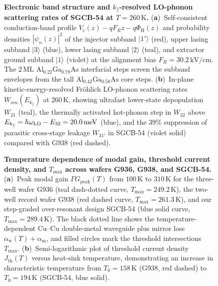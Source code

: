 \documentclass[11pt,letterpaper]{article}
\renewcommand{\hbar}{\mathchar'26\mkern-9mu h}
\begin{document}
\begin{figure}[t!]
\centering
\resizebox{0.97\textwidth}{!}{}
\caption{\textbf{Electronic band structure and $k_\parallel$-resolved LO-phonon scattering rates of SGCB-54 at $T = 260\,\mathrm{K}$.} (\textbf{a})~Self-consistent conduction-band profile $V_c(z) - q F_R z - q\Phi_{\mathrm{H}}(z)$ and probability densities $|\psi_n(z)|^2$ of the injector subband $|1'\rangle$ (red), upper lasing subband $|3\rangle$ (blue), lower lasing subband $|2\rangle$ (teal), and extractor ground subband $|1\rangle$ (violet) at the alignment bias $F_R = 30.2\,\mathrm{kV/cm}$. The $2\,\mathrm{ML}$ $\mathrm{Al}_{0.22}\mathrm{Ga}_{0.78}\mathrm{As}$ interfacial steps screen the subband envelopes from the tall $\mathrm{Al}_{0.42}\mathrm{Ga}_{0.58}\mathrm{As}$ core steps. (\textbf{b})~In-plane kinetic-energy-resolved Fr\"ohlich LO-phonon scattering rates $W_{mn}(E_{k_\parallel})$ at $260\,\mathrm{K}$, showing ultrafast lower-state depopulation $W_{21}$ (teal), the thermally activated hot-phonon step in $W_{32}$ above $E_{k_\parallel} = \hbar\omega_{\mathrm{LO}} - E_{32} = 20.0\,\mathrm{meV}$ (blue), and the $39\%$ suppression of parasitic cross-stage leakage $W_{31'}$ in SGCB-54 (violet solid) compared with G938 (red dashed).}
\label{fig:real_subbands}
\end{figure}

\begin{figure}[t!]
\centering
\resizebox{0.97\textwidth}{!}{}
\caption{\textbf{Temperature dependence of modal gain, threshold current density, and $T_{\max}$ across wafers G936, G938, and SGCB-54.} (\textbf{a})~Peak modal gain $\Gamma G_{\mathrm{peak}}(T)$ from $100\,\mathrm{K}$ to $310\,\mathrm{K}$ for the three-well wafer G936 (teal dash-dotted curve, $T_{\max} = 249.2\,\mathrm{K}$), the two-well record wafer G938 (red dashed curve, $T_{\max} = 261.3\,\mathrm{K}$), and our step-graded over-resonant design SGCB-54 (blue solid curve, $T_{\max} = 289.4\,\mathrm{K}$). The black dotted line shows the temperature-dependent $\mathrm{Cu}$--$\mathrm{Cu}$ double-metal waveguide plus mirror loss $\alpha_{\mathrm{w}}(T) + \alpha_{\mathrm{m}}$, and filled circles mark the threshold intersections $T_{\max}$. (\textbf{b})~Semi-logarithmic plot of threshold current density $J_{\mathrm{th}}(T)$ versus heat-sink temperature, demonstrating an increase in characteristic temperature from $T_0 = 158\,\mathrm{K}$ (G938, red dashed) to $T_0 = 194\,\mathrm{K}$ (SGCB-54, blue solid).}
\label{fig:tmax_comparison}
\end{figure}
\end{document}
